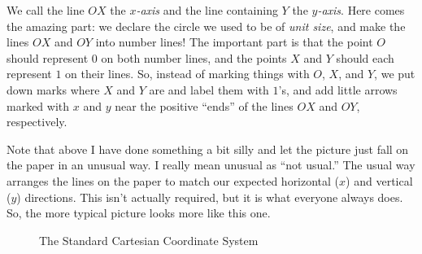 \documentclass[00-livre-main.tex]{subfiles}
\begin{document}
\begin{figure}[h!]
\centering
{}
\end{figure}

We call the line $OX$ the \emph{$x$-axis} and the line containing $Y$ the \emph{$y$-axis}. Here comes the amazing part: we declare the circle we used to be of \emph{unit size}, and make the lines $OX$ and $OY$ into number lines! The important part is that the point $O$ should represent $0$ on both number lines, and the points $X$ and $Y$ should each represent $1$ on their lines. So, instead of marking things with $O$, $X$, and $Y$, we put down marks where $X$ and $Y$ are and label them with $1$'s, and add little arrows marked with $x$ and $y$ near the positive ``ends'' of the lines $OX$ and $OY$, respectively.

\begin{figure}[h!]
\centering
{}
\end{figure}

Note that above I have done something a bit silly and let the picture just fall on the paper in an unusual way. 
I really mean unusual as ``not usual.'' 
The usual way arranges the lines on the paper to match our expected horizontal ($x$) and vertical ($y$) directions. 
This isn't actually required, but it is what everyone always does. 
So, the more typical picture looks more like this one.


\begin{figure}[h]
\centering
{}
\caption{The Standard Cartesian Coordinate System}
\end{figure}
\end{document}
